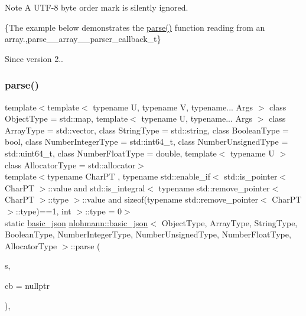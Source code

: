 \begin{DoxyNote}{Note}
A U\+T\+F-\/8 byte order mark is silently ignored.
\end{DoxyNote}
\{The example below demonstrates the {\ttfamily \hyperlink{classnlohmann_1_1basic__json_ace63ac4eb1dd7251a259d32e397461a3}{parse()}} function reading from an array.,parse\+\_\+\+\_\+array\+\_\+\+\_\+parser\+\_\+callback\+\_\+t\}

\begin{DoxySince}{Since}
version 2.. 
\end{DoxySince}
\hypertarget{classnlohmann_1_1basic__json_a90f05d55d9d0702c075cd281fd0d85ae}{}\label{classnlohmann_1_1basic__json_a90f05d55d9d0702c075cd281fd0d85ae} 
\subsubsection{\texorpdfstring{parse()}{parse()}\hspace{0.1cm}{\footnotesize\ttfamily [2/6]}}
{\footnotesize\ttfamily template$<$template$<$ typename U, typename V, typename... Args $>$ class Object\+Type = std\+::map, template$<$ typename U, typename... Args $>$ class Array\+Type = std\+::vector, class String\+Type  = std\+::string, class Boolean\+Type  = bool, class Number\+Integer\+Type  = std\+::int64\+\_\+t, class Number\+Unsigned\+Type  = std\+::uint64\+\_\+t, class Number\+Float\+Type  = double, template$<$ typename U $>$ class Allocator\+Type = std\+::allocator$>$ \\
template$<$typename Char\+PT , typename std\+::enable\+\_\+if$<$ std\+::is\+\_\+pointer$<$ Char\+P\+T $>$\+::value and std\+::is\+\_\+integral$<$ typename std\+::remove\+\_\+pointer$<$ Char\+P\+T $>$\+::type $>$\+::value and sizeof(typename std\+::remove\+\_\+pointer$<$ Char\+P\+T $>$\+::type)==1, int $>$\+::type  = 0$>$ \\
static \hyperlink{classnlohmann_1_1basic__json}{basic\+\_\+json} \hyperlink{classnlohmann_1_1basic__json}{nlohmann\+::basic\+\_\+json}$<$ Object\+Type, Array\+Type, String\+Type, Boolean\+Type, Number\+Integer\+Type, Number\+Unsigned\+Type, Number\+Float\+Type, Allocator\+Type $>$\+::parse (\begin{DoxyParamCaption}\item[{const Char\+PT}]{s,  }\item[{const \hyperlink{classnlohmann_1_1basic__json_a9e35475e2027520a78e09f460dbe048a}{parser\+\_\+callback\+\_\+t}}]{cb = {\ttfamily nullptr} }\end{DoxyParamCaption})\hspace{0.3cm}{\ttfamily [inline]}, {\ttfamily [static]}}



